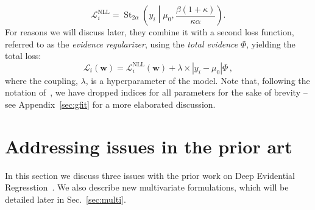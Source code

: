 \documentclass{article}
\begin{document}
\begin{equation}
    \mathcal{L}_i^\text{NLL} = \operatorname{St}_{2\alpha}\!\left( y_i \middle| \mu_0, \frac{\beta(1 + \kappa)}{\kappa \alpha} \right) .
\end{equation}
For reasons we will discuss later, they combine it with a second loss function, referred to as the \textit{evidence regularizer}, using the \textit{total evidence} $\Phi$, yielding the total loss:
\begin{equation}
    \mathcal{L}_i(\bm{w}) = \mathcal{L}_i^\text{NLL}(\bm{w}) + \lambda \times |y_i - \mu_0| \Phi \,,
\end{equation}
where the coupling, $\lambda$, is a hyperparameter of the model.
Note that, following the notation of~\cite{amini20}, we have dropped indices for all parameters for the sake of brevity -- see Appendix~\ref{sec:gfit} for a more elaborated discussion.

\section{Addressing issues in the prior art}
\label{sec:issues}
In this section we discuss three issues with the prior work on Deep Evidential Regresstion~\cite{amini20}.
We also describe new multivariate formulations,  which will be detailed later in Sec.~\ref{sec:multi}.
\end{document}
